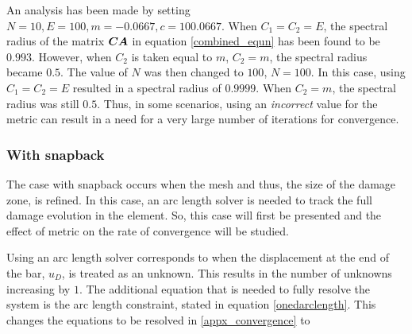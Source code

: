 \documentclass[12pt]{elsarticle}
\begin{document}
An analysis has been made by setting $N=10, E=100, m=-0.0667, c=100.0667$. When $C_1=C_2=E$, the spectral radius of the matrix $\mbox{\boldmath $C$} \mbox{\boldmath $A$} $ in equation \ref{combined_equn} has been found to be $0.993$. However, when $C_2$ is taken equal to $m$, $C_2=m$, the spectral radius became $0.5$. The value of $N$ was then changed to $100$, $N=100$. In this case, using $C_1=C_2=E$ resulted in a spectral radius of $0.9999$. When $C_2=m$, the spectral radius was still $0.5$. Thus, in some scenarios, using an \textit{incorrect} value for the metric can result in a need for a very large number of iterations for convergence.

\subsubsection*{With snapback}
The case with snapback occurs when the mesh and thus, the size of the damage zone, is refined. In this case, an arc length solver is needed to track the full damage evolution in the element. So, this case will first be presented and the effect of metric on the rate of convergence will be studied.

Using an arc length solver corresponds to when the displacement at the end of the bar, $u_D$, is treated as an unknown. This results in the number of unknowns increasing by $1$. The additional equation that is needed to fully resolve the system is the arc length constraint, stated in equation \ref{onedarclength}. This changes the equations to be resolved in \ref{appx_convergence} to 
\end{document}
